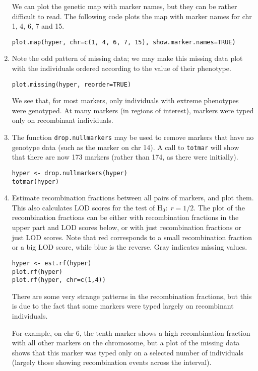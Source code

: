 \documentclass[10pt,letterpaper]{article}
\newcommand{\usercolor}{\color [named]{BlueViolet}}
\begin{document}
\begin{enumerate}
We can plot the genetic map with marker names, but they can be rather
difficult to read.  The following code plots the map with marker names
for chr 1, 4, 6, 7 and 15.

\usercolor
\verb|plot.map(hyper, chr=c(1, 4, 6, 7, 15), show.marker.names=TRUE)|
\normalcolor

\item Note the odd pattern of missing data; we may make this missing
data plot with the individuals ordered according to the value of their
phenotype.

\usercolor 
\verb|plot.missing(hyper, reorder=TRUE)| 
\normalcolor

We see that, for most markers, only individuals with extreme
phenotypes were genotyped.  At many markers (in regions of interest),
markers were typed only on recombinant individuals.

\item The function \verb-drop.nullmarkers- may be used to remove
markers that have no genotype data (such as the marker on chr
14).  A call to \verb-totmar- will show that there are now 173 markers
(rather than 174, as there were initially).  

\usercolor
\verb|hyper <- drop.nullmarkers(hyper)| \\
\verb|totmar(hyper)| \normalcolor

\item Estimate recombination fractions between all pairs of markers,
and plot them. This also calculates LOD scores for the test of
H$_0{:} \; r=1/2$.  The plot of the recombination fractions can be
either with recombination fractions in the upper part and LOD scores
below, or with just recombination fractions or just LOD scores.  Note
that red corresponds to a small recombination fraction or a big LOD
score, while blue is the reverse.  Gray indicates missing values.

\usercolor \verb|hyper <- est.rf(hyper)| \\
\verb|plot.rf(hyper)| \\
\verb|plot.rf(hyper, chr=c(1,4))| \normalcolor

There are some very strange patterns in the recombination fractions,
but this is due to the fact that some markers were typed largely on
recombinant individuals.

For example, on chr 6, the tenth marker shows a high recombination
fraction with all other markers on the chromosome, but a plot of the
missing data shows that this marker was typed only on a selected
number of individuals (largely those showing recombination events
across the interval).


\end{enumerate}
\end{document}
